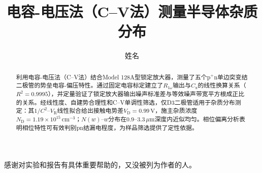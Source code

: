 \documentclass[font=default]{mpltx}
\begin{document}
\title{电容-电压法（C--V法）测量半导体杂质分布}
\author{姓名}
\date{}
\begin{abstract}
  利用电容-电压法（C--V法）结合Model 128A型锁定放大器，测量了五个$\mathrm{p}^+\mathrm{n}$单边突变结二极管的势垒电容-偏压特性。通过固定电容标定建立了$R_{1\omega}$输出与$C_{\mathrm{x}}$的线性换算关系（$R^{2}=0.9995$），并定量验证了锁定放大器输出噪声标准差与等效噪声带宽平方根成正比的关系。经线性度、自建势合理性和C--V单调性筛选，仅D3二极管适用于杂质分布测定：其$1/C^{2}$--$V_{\mathrm{R}}$线性拟合给出接触电势差$V_{\mathrm{D}}=0.99\,\mathrm{V}$，施主杂质浓度$N_{\mathrm{D}}=1.19\times10^{15}\,\mathrm{cm^{-3}}$；$N(w)$--$w$分布在$0.9$--$3.3\,\mu\mathrm{m}$深度内近似均匀。相位偏离分析表明相位特性可有效判别pn结漏电程度，为样品筛选提供了定性依据。
\end{abstract}

\maketitle











\begin{acknowledgments}
  感谢对实验和报告有具体重要帮助的，又没被列为作者的人。
\end{acknowledgments}



\end{document}
